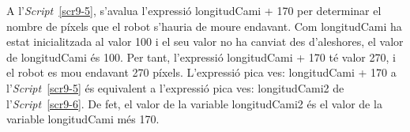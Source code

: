 A l'\emph{Script}~\ref{scr9-5}, s'avalua l'expressió \textsf{longitudCami + 170} per determinar el nombre de píxels que el robot s'hauria de moure endavant. Com \textsf{longitudCami} ha estat inicialitzada al valor \textsf{100} i el seu valor no ha canviat des d'aleshores, el valor de \textsf{longitudCami} és \textsf{100}. Per tant, l'expressió \textsf{longitudCami + 170} té valor \textsf{270}, i el robot es mou endavant \textsf{270} píxels. L'expressió \textsf{pica ves: longitudCami + 170} a l'\emph{Script}~\ref{scr9-5} és equivalent a l'expressió \textsf{pica ves: longitudCami2} de l'\emph{Script}~\ref{scr9-6}. De fet, el valor de la variable \textsf{longitudCami2} és el valor de la variable \textsf{longitudCami} més \textsf{170}. 

